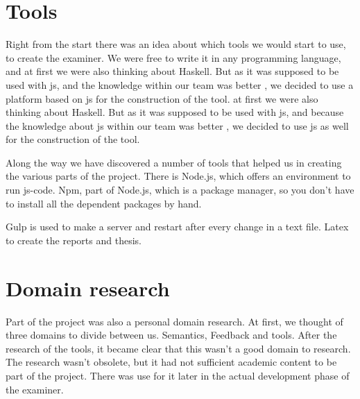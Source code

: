 \section{Tools}

Right from the start there was an idea about which tools we would start to use, to create the examiner. We were free to write it in any programming language, and
at first we were also thinking about Haskell.			
But as it was supposed to be used with \gls{js}, and the knowledge within our
team was better 
, we decided to use a platform based on \gls{js} for the construction of the tool. 
at first we were also thinking about Haskell.
But as it was supposed to be used with \gls{js}, and because the knowledge about \gls{js} within our
team was better %
, we decided to use \gls{js} as well for the construction of the tool.

Along the way we have discovered a number of tools that helped us in creating the various parts of the project.
There is Node.js, which offers an environment to run \gls{js-code}.
Npm, part of Node.js, which is a package manager, so you don't have to install
all the dependent packages by hand.

Gulp is used to make a server and restart after every change in a text file.
Latex to create the reports and thesis.

\section{Domain research}
Part of the project was also a personal domain research. At first, we thought of
three domains to divide between us.
Semantics, Feedback and tools.
After the research of the tools, it became clear that this wasn't a good domain
to research.
The research wasn't obsolete, but it had not sufficient academic content to be
part of the project.
There was use for it later in the actual development phase of the \gls{examiner}.
